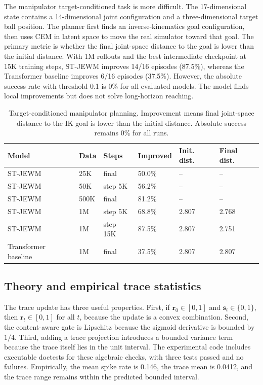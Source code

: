 \documentclass[10pt]{article}
\newcommand{\method}{ST-JEWM}
\newcommand{\trace}{\mathbf{r}}
\newcommand{\spike}{\mathbf{s}}
\begin{document}
The manipulator target-conditioned task is more difficult. The 17-dimensional state contains a 14-dimensional joint configuration and a three-dimensional target ball position. The planner first finds an inverse-kinematics goal configuration, then uses CEM in latent space to move the real simulator toward that goal. The primary metric is whether the final joint-space distance to the goal is lower than the initial distance. With 1M rollouts and the best intermediate checkpoint at 15K training steps, \method{} improves 14/16 episodes (87.5\%), whereas the Transformer baseline improves 6/16 episodes (37.5\%). However, the absolute success rate with threshold 0.1 is 0\% for all evaluated models. The model finds local improvements but does not solve long-horizon reaching.

\begin{table}[t]
\centering
\caption{Target-conditioned manipulator planning. Improvement means final joint-space distance to the IK goal is lower than the initial distance. Absolute success remains 0\% for all runs.}
\label{tab:target_manipulator}
\small
\begin{tabular}{llllll}
\toprule
Model & Data & Steps & Improved & Init. dist. & Final dist. \\
\midrule
\method{} & 25K & final & 50.0\% & -- & -- \\
\method{} & 50K & step 5K & 56.2\% & -- & -- \\
\method{} & 500K & final & 81.2\% & -- & -- \\
\method{} & 1M & step 5K & 68.8\% & 2.807 & 2.768 \\
\method{} & 1M & step 15K & 87.5\% & 2.807 & 2.751 \\
Transformer baseline & 1M & final & 37.5\% & 2.807 & 2.807 \\
\bottomrule
\end{tabular}
\end{table}

\subsection{Theory and empirical trace statistics}

The trace update has three useful properties. First, if $\trace_0\in[0,1]$ and $\spike_t\in\{0,1\}$, then $\trace_t\in[0,1]$ for all $t$, because the update is a convex combination. Second, the content-aware gate is Lipschitz because the sigmoid derivative is bounded by $1/4$. Third, adding a trace projection introduces a bounded variance term because the trace itself lies in the unit interval. The experimental code includes executable doctests for these algebraic checks, with three tests passed and no failures. Empirically, the mean spike rate is 0.146, the trace mean is 0.0412, and the trace range remains within the predicted bounded interval.
\end{document}
